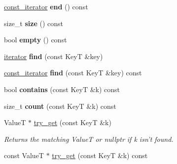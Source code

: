 \begin{DoxyCompactItemize}
\item 
\hypertarget{classemlib_1_1_hash_map_a9aa7b0fcb0e5656944bf7d077cff0283}{\hyperlink{classemlib_1_1_hash_map_1_1const__iterator}{const\+\_\+iterator} {\bfseries end} () const }\label{classemlib_1_1_hash_map_a9aa7b0fcb0e5656944bf7d077cff0283}

\item 
\hypertarget{classemlib_1_1_hash_map_a996495b56d4c3def071070534c5d3a99}{size\+\_\+t {\bfseries size} () const }\label{classemlib_1_1_hash_map_a996495b56d4c3def071070534c5d3a99}

\item 
\hypertarget{classemlib_1_1_hash_map_a6695a957c6e6e92684234bf382186e3e}{bool {\bfseries empty} () const }\label{classemlib_1_1_hash_map_a6695a957c6e6e92684234bf382186e3e}

\item 
\hypertarget{classemlib_1_1_hash_map_a9bc7312fa53117da49b46b7d9a06c71b}{\hyperlink{classemlib_1_1_hash_map_1_1iterator}{iterator} {\bfseries find} (const Key\+T \&key)}\label{classemlib_1_1_hash_map_a9bc7312fa53117da49b46b7d9a06c71b}

\item 
\hypertarget{classemlib_1_1_hash_map_a513c236a79f69deb6c930d0e2775e862}{\hyperlink{classemlib_1_1_hash_map_1_1const__iterator}{const\+\_\+iterator} {\bfseries find} (const Key\+T \&key) const }\label{classemlib_1_1_hash_map_a513c236a79f69deb6c930d0e2775e862}

\item 
\hypertarget{classemlib_1_1_hash_map_a86cb2a71cf95f72714e4b06dd292a25f}{bool {\bfseries contains} (const Key\+T \&k) const }\label{classemlib_1_1_hash_map_a86cb2a71cf95f72714e4b06dd292a25f}

\item 
\hypertarget{classemlib_1_1_hash_map_af4d39c93b37e8a94e1d7c07d9b11621e}{size\+\_\+t {\bfseries count} (const Key\+T \&k) const }\label{classemlib_1_1_hash_map_af4d39c93b37e8a94e1d7c07d9b11621e}

\item 
\hypertarget{classemlib_1_1_hash_map_a1faf4de0b1baa65cdc3e886adde866ea}{Value\+T $\ast$ \hyperlink{classemlib_1_1_hash_map_a1faf4de0b1baa65cdc3e886adde866ea}{try\+\_\+get} (const Key\+T \&k)}\label{classemlib_1_1_hash_map_a1faf4de0b1baa65cdc3e886adde866ea}

\begin{DoxyCompactList}\small\item\em Returns the matching Value\+T or nullptr if k isn't found. \end{DoxyCompactList}\item 
\hypertarget{classemlib_1_1_hash_map_a7bd462d0e5b0a7bc6f9b832c052c1549}{const Value\+T $\ast$ \hyperlink{classemlib_1_1_hash_map_a7bd462d0e5b0a7bc6f9b832c052c1549}{try\+\_\+get} (const Key\+T \&k) const }\label{classemlib_1_1_hash_map_a7bd462d0e5b0a7bc6f9b832c052c1549}


\end{DoxyCompactItemize}
